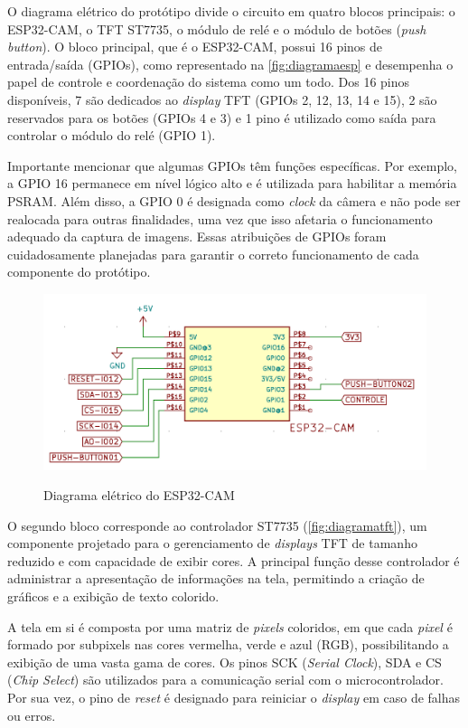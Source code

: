 O diagrama elétrico do protótipo divide o circuito em quatro blocos 
principais: o ESP32-CAM, o TFT ST7735, o módulo de relé e o módulo 
de botões (\textit{push button}). O bloco principal, que é o ESP32-CAM, 
possui 16 pinos de entrada/saída (GPIOs), como representado na 
\autoref{fig:diagramaesp} e desempenha o papel de controle e 
coordenação do sistema como um todo. Dos 16 pinos disponíveis, 
7 são dedicados ao \textit{display} TFT (GPIOs 2, 12, 13, 14 e 15), 2 são 
reservados para os botões (GPIOs 4 e 3) e 1 pino é utilizado 
como saída para controlar o módulo do relé (GPIO 1).

Importante mencionar que algumas GPIOs têm funções específicas. 
Por exemplo, a GPIO 16 permanece em nível lógico alto e é utilizada 
para habilitar a memória PSRAM. Além disso, a GPIO 0 é designada como 
\textit{clock} da câmera e não pode ser realocada para outras finalidades, 
uma vez que isso afetaria o funcionamento adequado da captura de 
imagens. Essas atribuições de GPIOs foram cuidadosamente 
planejadas para garantir o correto funcionamento de 
cada componente do protótipo. 

\begin{figure}[h!]
    \centering
    \caption{Diagrama elétrico do ESP32-CAM}
    \includegraphics[scale=0.3]{figuras/modulo_esp.png}
    \fonte{}%
    \label{fig:diagramaesp}
    \centering
\end{figure}

O segundo bloco corresponde ao controlador ST7735 (\autoref{fig:diagramatft}), 
um componente projetado para o gerenciamento de \textit{displays} TFT de tamanho 
reduzido e com capacidade de exibir cores. A principal função desse 
controlador é administrar a apresentação de informações na tela, 
permitindo a criação de gráficos e a exibição de texto colorido.

A tela em si é composta por uma matriz de \textit{pixels} coloridos, em que 
cada \textit{pixel} é formado por subpixels nas cores vermelha, verde e azul 
(RGB), possibilitando a exibição de uma vasta gama de cores. Os pinos 
SCK (\textit{Serial Clock}), SDA e CS (\textit{Chip Select}) são utilizados para a 
comunicação serial com o microcontrolador. Por sua vez, o pino de 
\textit{reset} é designado para reiniciar o \textit{display} em caso de falhas ou erros.

